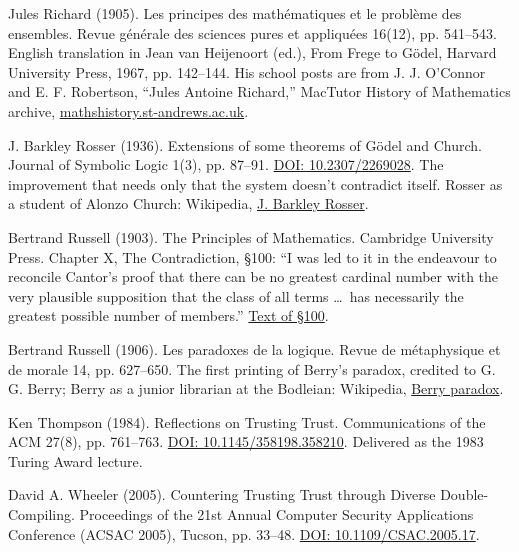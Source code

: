 \noindent Jules Richard (1905). Les principes des math\'ematiques et le probl\`eme des ensembles. Revue g\'en\'erale des sciences pures et appliqu\'ees 16(12), pp. 541--543. English translation in Jean van Heijenoort (ed.), From Frege to G\"odel, Harvard University Press, 1967, pp. 142--144. His school posts are from J. J. O'Connor and E. F. Robertson, ``Jules Antoine Richard,'' MacTutor History of Mathematics archive, \href{https://mathshistory.st-andrews.ac.uk/Biographies/Richard_Jules/}{mathshistory.st-andrews.ac.uk}.
\par\medskip

\noindent J. Barkley Rosser (1936). Extensions of some theorems of G\"odel and Church. Journal of Symbolic Logic 1(3), pp. 87--91. \href{https://doi.org/10.2307/2269028}{DOI: 10.2307/2269028}. The improvement that needs only that the system doesn't contradict itself. Rosser as a student of Alonzo Church: Wikipedia, \href{https://en.wikipedia.org/wiki/J._Barkley_Rosser}{J. Barkley Rosser}.
\par\medskip

\noindent Bertrand Russell (1903). The Principles of Mathematics. Cambridge University Press. Chapter X, The Contradiction, \S100: ``I was led to it in the endeavour to reconcile Cantor's proof that there can be no greatest cardinal number with the very plausible supposition that the class of all terms \ldots\ has necessarily the greatest possible number of members.'' \href{https://fair-use.org/bertrand-russell/the-principles-of-mathematics/s100}{Text of \S100}.
\par\medskip

\noindent Bertrand Russell (1906). Les paradoxes de la logique. Revue de m\'etaphysique et de morale 14, pp. 627--650. The first printing of Berry's paradox, credited to G. G. Berry; Berry as a junior librarian at the Bodleian: Wikipedia, \href{https://en.wikipedia.org/wiki/Berry_paradox}{Berry paradox}.
\par\medskip

\noindent Ken Thompson (1984). Reflections on Trusting Trust. Communications of the ACM 27(8), pp. 761--763. \href{https://doi.org/10.1145/358198.358210}{DOI: 10.1145/358198.358210}. Delivered as the 1983 Turing Award lecture.
\par\medskip

\noindent David A. Wheeler (2005). Countering Trusting Trust through Diverse Double-Compiling. Proceedings of the 21st Annual Computer Security Applications Conference (ACSAC 2005), Tucson, pp. 33--48. \href{https://doi.org/10.1109/CSAC.2005.17}{DOI: 10.1109/CSAC.2005.17}.
\par\medskip

